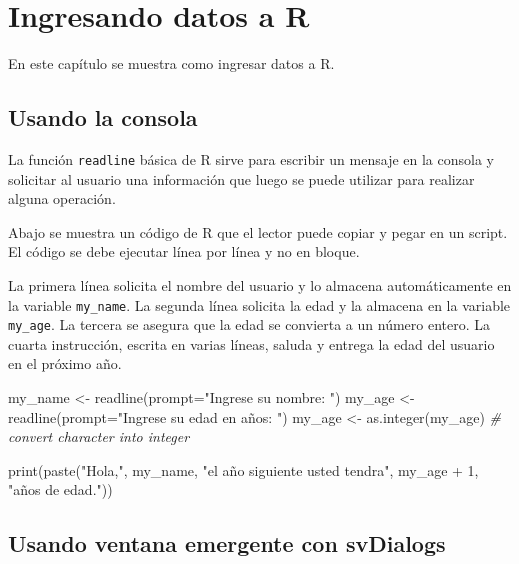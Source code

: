 \documentclass[
]{book}
\makeatletter
\newenvironment{Shaded}{\begin{snugshade}}{\end{snugshade}}
\newcommand{\AttributeTok}[1]{\textcolor[rgb]{0.77,0.63,0.00}{#1}}
\newcommand{\CommentTok}[1]{\textcolor[rgb]{0.56,0.35,0.01}{\textit{#1}}}
\newcommand{\DecValTok}[1]{\textcolor[rgb]{0.00,0.00,0.81}{#1}}
\newcommand{\FunctionTok}[1]{\textcolor[rgb]{0.00,0.00,0.00}{#1}}
\newcommand{\NormalTok}[1]{#1}
\newcommand{\OtherTok}[1]{\textcolor[rgb]{0.56,0.35,0.01}{#1}}
\newcommand{\SpecialCharTok}[1]{\textcolor[rgb]{0.00,0.00,0.00}{#1}}
\newcommand{\StringTok}[1]{\textcolor[rgb]{0.31,0.60,0.02}{#1}}
\newenvironment{kframe}{%
\medskip{}
\setlength{\fboxsep}{.8em}
 \def\at@end@of@kframe{}%
 \ifinner\ifhmode%
  \def\at@end@of@kframe{\end{minipage}}%
  \begin{minipage}{\columnwidth}%
 \fi\fi%
 \def\FrameCommand##1{\hskip\@totalleftmargin \hskip-\fboxsep
 \colorbox{shadecolor}{##1}\hskip-\fboxsep
     \hskip-\linewidth \hskip-\@totalleftmargin \hskip\columnwidth}%
 \MakeFramed {\advance\hsize-\width
   \@totalleftmargin\z@ \linewidth\hsize
   \@setminipage}}%
 {\par\unskip\endMakeFramed%
 \at@end@of@kframe}
\renewenvironment{Shaded}{\begin{kframe}}{\end{kframe}}
\makeatother
\begin{document}
\hypertarget{ingresando-datos-a-r}{%
\chapter{Ingresando datos a R}\label{ingresando-datos-a-r}}

En este capítulo se muestra como ingresar datos a R.

\hypertarget{usando-la-consola}{%
\section{Usando la consola}\label{usando-la-consola}}

La función \texttt{readline} básica de R sirve para escribir un mensaje en la consola y solicitar al usuario una información que luego se puede utilizar para realizar alguna operación.

Abajo se muestra un código de R que el lector puede copiar y pegar en un script. El código se debe ejecutar línea por línea y no en bloque.

La primera línea solicita el nombre del usuario y lo almacena automáticamente en la variable \texttt{my\_name}. La segunda línea solicita la edad y la almacena en la variable \texttt{my\_age}. La tercera se asegura que la edad se convierta a un número entero. La cuarta instrucción, escrita en varias líneas, saluda y entrega la edad del usuario en el próximo año.

\begin{Shaded}
\begin{Highlighting}[]
\NormalTok{my\_name }\OtherTok{\textless{}{-}} \FunctionTok{readline}\NormalTok{(}\AttributeTok{prompt=}\StringTok{"Ingrese su nombre: "}\NormalTok{)}
\NormalTok{my\_age  }\OtherTok{\textless{}{-}} \FunctionTok{readline}\NormalTok{(}\AttributeTok{prompt=}\StringTok{"Ingrese su edad en años: "}\NormalTok{)}
\NormalTok{my\_age  }\OtherTok{\textless{}{-}} \FunctionTok{as.integer}\NormalTok{(my\_age) }\CommentTok{\# convert character into integer}

\FunctionTok{print}\NormalTok{(}\FunctionTok{paste}\NormalTok{(}\StringTok{"Hola,"}\NormalTok{, my\_name, }
            \StringTok{"el año siguiente usted tendra"}\NormalTok{, }
\NormalTok{            my\_age }\SpecialCharTok{+} \DecValTok{1}\NormalTok{, }
            \StringTok{"años de edad."}\NormalTok{))}
\end{Highlighting}
\end{Shaded}

\hypertarget{usando-ventana-emergente-con-svdialogs}{%
\section{\texorpdfstring{Usando ventana emergente con \textbf{svDialogs}}{Usando ventana emergente con svDialogs}}\label{usando-ventana-emergente-con-svdialogs}}
\end{document}
